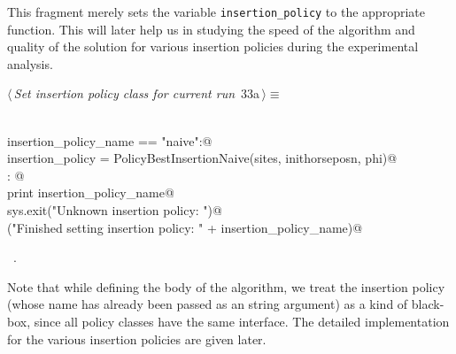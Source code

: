 \documentclass[11.5pt]{report}
\begin{document}

\vspace{-0.8cm}\newchunk This fragment merely sets the variable \verb|insertion_policy| to 
the appropriate function. This will later help us in studying the speed of 
the algorithm and quality of the solution for various insertion policies 
during the experimental analysis. 

\begin{flushleft} \small\label{scrap35}\raggedright\small
{} $\langle\,${\itshape Set insertion policy class for current run}\nobreak\ {\footnotesize {33a}}$\,\rangle\equiv$
\vspace{-1ex}
\begin{list}{}{} \item
\mbox{}\verb@@\\
\mbox{}\verb@if insertion_policy_name == "naive":@\\
\mbox{}\verb@     insertion_policy = PolicyBestInsertionNaive(sites, inithorseposn, phi)@\\
\mbox{}\verb@else: @\\
\mbox{}\verb@     print insertion_policy_name@\\
\mbox{}\verb@     sys.exit("Unknown insertion policy: ")@\\
\mbox{}\verb@debug("Finished setting insertion policy: " + insertion_policy_name)@\\
\mbox{}\verb@@{\NWsep}
\end{list}
\vspace{-1.5ex}
\footnotesize
\begin{list}{}{\setlength{\itemsep}{-\parsep}\setlength{\itemindent}{-\leftmargin}}
\item \NWtxtMacroRefIn\ .

\item{}
\end{list}
\vspace{4ex}
\end{flushleft}

\vspace{-0.8cm}\newchunk Note that while defining the body of the algorithm, we treat the insertion policy 
(whose name has already been passed as an string argument) as a kind of black-box, since all 
policy classes have the same interface. The detailed implementation for the various 
insertion policies are given later. 
\end{document}
